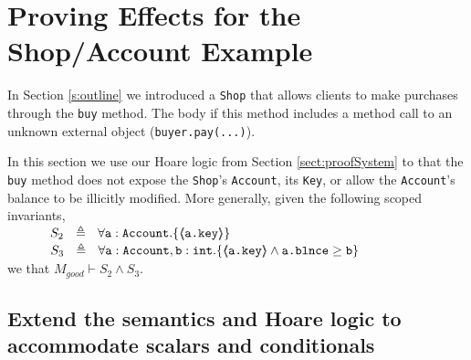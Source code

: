 \newcommand{\SPT}{~ \strut \hspace{.9cm}}

\section{  {Proving \Tamed Effects for the Shop/Account Example}}

\label{s:app:example}

In Section \ref{s:outline} we introduced a \verb|Shop| that allows clients to make purchases through the
\verb|buy| method.
The body if this method  includes a method call to an unknown external object (\verb|buyer.pay(...)|).

In this section  we use our Hoare logic from Section \ref{sect:proofSystem} to  that the \verb|buy| method
does not expose the \verb|Shop|'s  \verb|Account|, its \verb|Key|, or allow the \verb|Account|'s balance to be illicitly modified. 
More generally,   given  the following scoped invariants, \\  
$\strut  \SPSP  S_2\ \  \triangleq \ \ \TwoStatesN  {\prg{a}:\prg{Account}}  {\inside{\prg{a.key}}} $ 
 \\
$\strut  \SPSP  S_3\ \  \triangleq \ \ \TwoStatesN{ \prg{a}:\prg{Account},\prg{b}:\prg{int} } {\inside{\prg{a.key}} \wedge \prg{a.\balance} \geq \prg{b} } $ 
\\
 we  that $M_{good} \vdash S_2 \wedge S_3$.


\subsection{Extend the semantics and Hoare logic to accommodate scalars and conditionals}
\label{s:app:scalars}


